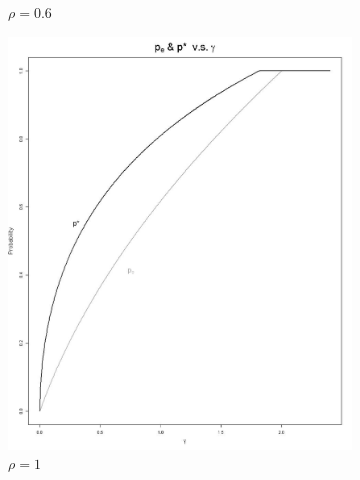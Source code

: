 \documentclass[11pt]{article}
\numberwithin{equation}{section}
\begin{document}
\begin{figure}[h!]
\begin{subfigure}[b]{0.49\textwidth}
		\caption{$\rho=0.6$}
	\end{subfigure}
	\begin{subfigure}[b]{0.49\textwidth}
	\includegraphics[width=\textwidth]{plots/pe_vs_pstar_rev_1.png}
		\caption{$\rho=1$}
	\end{subfigure}
	\begin{subfigure}[b]{0.49\textwidth}

\end{subfigure}
\end{figure}
\end{document}
